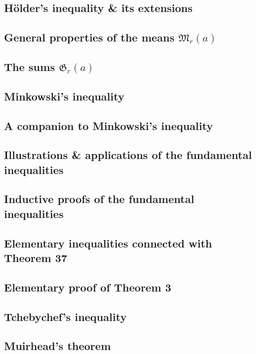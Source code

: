 \documentclass[oneside]{book}
\numberwithin{equation}{section}
\begin{document}
\subsection{H\"older's inequality \& its extensions}

\subsection{General properties of the means $\mathfrak{M}_r(a)$}

\subsection{The sums $\mathfrak{G}_r(a)$}

\subsection{Minkowski's inequality}

\subsection{A companion to Minkowski's inequality}

\subsection{Illustrations \& applications of the fundamental inequalities}

\subsection{Inductive proofs of the fundamental inequalities}

\subsection{Elementary inequalities connected with Theorem 37}

\subsection{Elementary proof of Theorem 3}

\subsection{Tchebychef's inequality}

\subsection{Muirhead's theorem}
\end{document}
